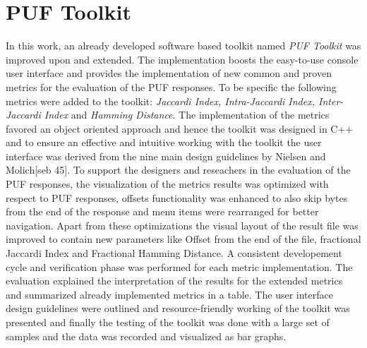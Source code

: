 \section{PUF Toolkit}
In this work, an already developed software based toolkit named \emph{PUF Toolkit} was improved upon and extended. The implementation boosts the easy-to-use console user interface and provides the implementation of new common and proven metrics for the evaluation of the PUF responses. To be specific the following metrics were added to the toolkit: \emph{Jaccardi Index, Intra-Jaccardi Index, Inter-Jaccardi Index} and \emph{Hamming Distance}. The implementation of the metrics favored an object
oriented approach and hence the toolkit was designed in C++ and to ensure an effective and intuitive working with the toolkit the user interface was derived from the nine main design guidelines by Nielsen and Molich[seb 45]. To support the designers and reseachers in the evaluation of the PUF responses, the visualization of the metrics results was optimized with respect to PUF responses, offsets functionality was enhanced to also skip bytes from the end of the response and menu items were rearranged for better navigation. Apart from
these optimizations the visual layout of the result file was improved to contain new parameters like Offset from the end of the file, fractional Jaccardi Index and Fractional Hamming Distance. A consistent developement cycle and verification phase was performed for each metric implementation. The evaluation explained the interpretation of the results for the extended metrics and summarized already implemented metrics in a table. The user interface design guidelines were outlined
and resource-friendly working of the toolkit was presented and finally the testing of the toolkit was done with a large set of samples and the data was recorded and visualized as bar graphs.\\


